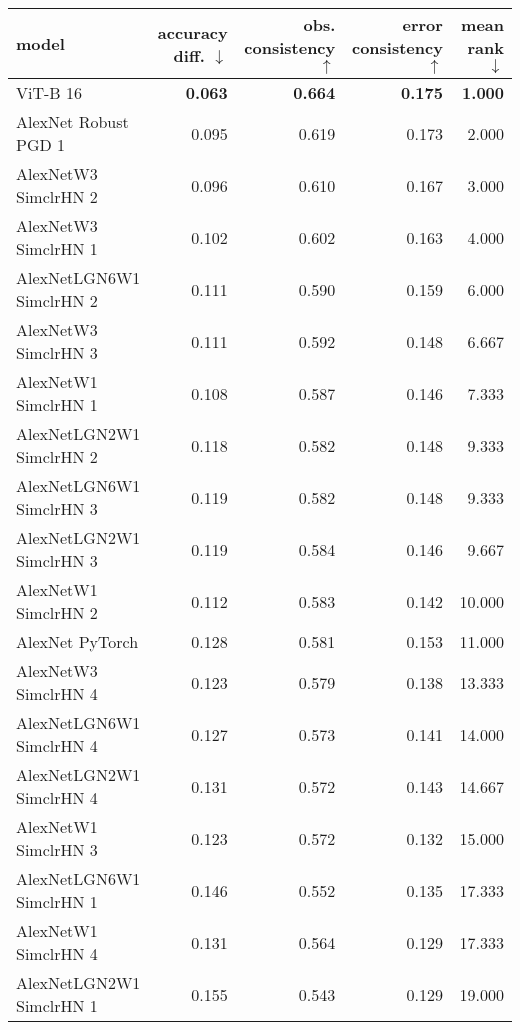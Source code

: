 \begin{tabular}{lrrrr}
\toprule
model & accuracy diff. $\downarrow$ & obs. consistency $\uparrow$ & error consistency $\uparrow$ & mean rank $\downarrow$ \\
\midrule
ViT-B 16 & \textbf{0.063} & \textbf{0.664} & \textbf{0.175} & \textbf{1.000} \\
AlexNet Robust PGD 1 & 0.095 & 0.619 & 0.173 & 2.000 \\
AlexNetW3 SimclrHN 2 & 0.096 & 0.610 & 0.167 & 3.000 \\
AlexNetW3 SimclrHN 1 & 0.102 & 0.602 & 0.163 & 4.000 \\
AlexNetLGN6W1 SimclrHN 2 & 0.111 & 0.590 & 0.159 & 6.000 \\
AlexNetW3 SimclrHN 3 & 0.111 & 0.592 & 0.148 & 6.667 \\
AlexNetW1 SimclrHN 1 & 0.108 & 0.587 & 0.146 & 7.333 \\
AlexNetLGN2W1 SimclrHN 2 & 0.118 & 0.582 & 0.148 & 9.333 \\
AlexNetLGN6W1 SimclrHN 3 & 0.119 & 0.582 & 0.148 & 9.333 \\
AlexNetLGN2W1 SimclrHN 3 & 0.119 & 0.584 & 0.146 & 9.667 \\
AlexNetW1 SimclrHN 2 & 0.112 & 0.583 & 0.142 & 10.000 \\
AlexNet PyTorch & 0.128 & 0.581 & 0.153 & 11.000 \\
AlexNetW3 SimclrHN 4 & 0.123 & 0.579 & 0.138 & 13.333 \\
AlexNetLGN6W1 SimclrHN 4 & 0.127 & 0.573 & 0.141 & 14.000 \\
AlexNetLGN2W1 SimclrHN 4 & 0.131 & 0.572 & 0.143 & 14.667 \\
AlexNetW1 SimclrHN 3 & 0.123 & 0.572 & 0.132 & 15.000 \\
AlexNetLGN6W1 SimclrHN 1 & 0.146 & 0.552 & 0.135 & 17.333 \\
AlexNetW1 SimclrHN 4 & 0.131 & 0.564 & 0.129 & 17.333 \\
AlexNetLGN2W1 SimclrHN 1 & 0.155 & 0.543 & 0.129 & 19.000 \\
\bottomrule
\end{tabular}

